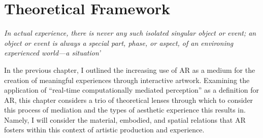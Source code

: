 \chapter{Theoretical Framework}
\label{sec: theory}
\epigraph{\emph{In actual experience, there is never any such isolated singular object or event; an object or event is always a special part, phase, or aspect, of an environing experienced world—a situation’}}{\citep[p. 67]{dewey1934}}
In the previous chapter, I outlined the increasing use of AR as a medium for the creation of meaningful experiences through interactive artwork. Examining the application of “real-time computationally mediated perception” \citep{kiefer2018} as a definition for AR, this chapter considers a trio of theoretical lenses through which to consider this process of mediation and the types of aesthetic experience this results in. Namely, I will consider the material, embodied, and spatial relations that AR fosters within this context of artistic production and experience.



